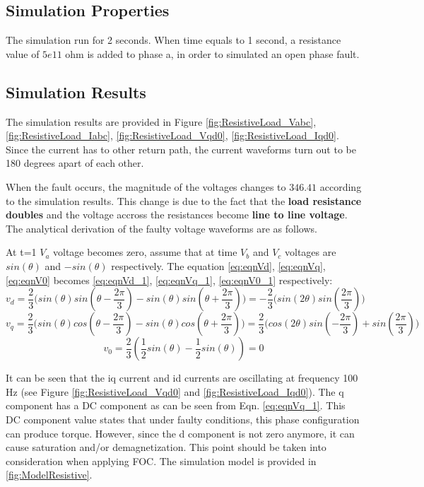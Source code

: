 \documentclass{article}
\begin{document}
\subsection{Simulation Properties}
The simulation run for 2 seconds. When time equals to 1 second, a resistance value of $5e11$  ohm is added to phase a, in order to simulated an open phase fault.

\subsection{Simulation Results}
The simulation results are provided in Figure \ref{fig:ResistiveLoad_Vabc}, \ref{fig:ResistiveLoad_Iabc}, \ref{fig:ResistiveLoad_Vqd0}, \ref{fig:ResistiveLoad_Iqd0}. Since the current has to other return path, the current waveforms turn out to be 180 degrees apart of each other. 

When the fault occurs, the magnitude of the voltages changes to $346.41$ according to the simulation results. This change is due to the fact that the \textbf{load resistance doubles} and the voltage accross the resistances become \textbf{line to line voltage}. 
The analytical derivation of the faulty voltage waveforms are as follows. 


At t=1 $V_a$ voltage becomes zero, assume that at time $V_b$ and $V_c$ voltages are $sin(\theta)$ and $-sin(\theta)$ respectively. The equation \ref{eq:eqnVd}, \ref{eq:eqnVq},  \ref{eq:eqnV0} becomes \ref{eq:eqnVd_1}, \ref{eq:eqnVq_1},  \ref{eq:eqnV0_1} respectively:
\begin{equation} \label{eq:eqnVd_1}
    v_d = \frac{2}{3}\Bigg(sin(\theta)sin(\theta-\frac{2\pi}{3}) - sin(\theta)sin(\theta+\frac{2\pi}{3})\Bigg) =  -\frac{2}{3}\Bigg(sin(2\theta)sin(\frac{2\pi}{3})\Bigg)
\end{equation}
\begin{equation} \label{eq:eqnVq_1}
v_q = \frac{2}{3}\Bigg(sin(\theta)cos(\theta-\frac{2\pi}{3}) - sin(\theta)cos(\theta+\frac{2\pi}{3})\Bigg) =  \frac{2}{3}\Bigg(cos(2\theta)sin(-\frac{2\pi}{3})+sin(\frac{2\pi}{3})\Bigg)
\end{equation}
\begin{equation} \label{eq:eqnV0_1}
 v_0 = \frac{2}{3}(\frac{1}{2}sin(\theta)-\frac{1}{2}sin(\theta)) = 0
\end{equation}

It can be seen that the iq current and id currents are oscillating at frequency 100 Hz (see Figure \ref{fig:ResistiveLoad_Vqd0} and \ref{fig:ResistiveLoad_Iqd0}). The q component has a DC component as can be seen from Eqn. \ref{eq:eqnVq_1}. This DC component value states that under faulty conditions, this phase configuration can produce torque. However, since the d component is not zero anymore, it can cause saturation and/or demagnetization. This point should be taken into consideration when applying FOC. The simulation model is provided in \ref{fig:ModelResistive}.
\end{document}
